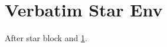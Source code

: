 \documentclass{article}
\begin{document}
\section{Verbatim Star Env}\label{sec:env_vstar}
\begin{verbatim*}
\cite{fake_env_vs} } \label{fake_lbl_vs} %
\end{verbatim*}
After star block \cite{k1} and \ref{sec:env_vstar}.


\end{document}
